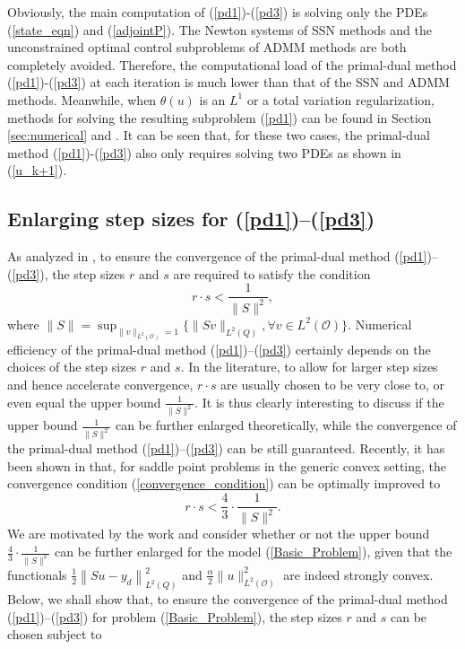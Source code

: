 \documentclass[final]{siamart171218}
\theoremstyle{remark}
\begin{document}
Obviously, the main computation of (\ref{pd1})-(\ref{pd3}) is solving only the PDEs (\ref{state_eqn}) and (\ref{adjointP}). The Newton systems of SSN methods and the unconstrained optimal control subproblems of ADMM methods are both completely avoided. Therefore, the computational load of the primal-dual method (\ref{pd1})-(\ref{pd3}) at each iteration is much lower than that of the SSN and ADMM methods.  Meanwhile, when $\theta(u)$ is an $L^1$ or a total variation regularization, methods for solving the resulting subproblem (\ref{pd1}) can be found in Section \ref{sec:numerical} and \cite{song2023admmpinns}. It can be seen that, for these two cases, the primal-dual method (\ref{pd1})-(\ref{pd3}) also only requires solving two PDEs as shown in (\ref{u_k+1}).

\subsection{Enlarging step sizes for (\ref{pd1})--(\ref{pd3})}
As analyzed in \cite{chambolle2011first}, to ensure the convergence of the primal-dual method (\ref{pd1})--(\ref{pd3}),  the step sizes $r$ and $s$ are required to satisfy the condition
\begin{equation}\label{convergence_condition}
	r\cdot s<\frac{1}{\|S\|^2},
\end{equation}
where
$
\|S\|={\sup}_{\|v\|_{L^2(\mathcal{O})}=1}\{\|Sv\|_{L^2(Q)}, \forall v\in L^2(\mathcal{O})\}
$. Numerical efficiency of the primal-dual method (\ref{pd1})--(\ref{pd3}) certainly depends on the choices of the step sizes $r$ and
$s$. In the literature, to allow for larger step sizes and hence accelerate convergence, $r\cdot s$ are usually chosen to be very close to, or even equal the upper bound $\frac{1}{\|S\|^2}$. It is thus clearly interesting to discuss if the upper bound $\frac{1}{\|S\|^2}$ can be further enlarged theoretically, while the convergence of the primal-dual method (\ref{pd1})--(\ref{pd3}) can be still guaranteed.
Recently, it has been shown in \cite{he2022} that, for saddle point problems in the generic convex setting, the convergence condition (\ref{convergence_condition}) can be optimally improved to
$$
r\cdot s < \frac{4}{3} \cdot \frac{1}{\|S \|^2}.
$$
We are motivated by the work \cite{he2022} and consider whether or not the upper bound $\frac{4}{3} \cdot \frac{1}{\|S \|^2}$ can be further enlarged for the model (\ref{Basic_Problem}), given that the functionals $ \frac{1}{2}\left\| Su-y_d \right\|_{L^2(Q)}^2$ and $\frac{\alpha}{2}\|u\|_{L^2(\mathcal{O})}^2$ are indeed strongly convex. Below, we shall show that, to ensure the convergence of the primal-dual method (\ref{pd1})--(\ref{pd3}) for problem (\ref{Basic_Problem}), the step sizes $r$ and $s$ can be chosen subject to
\end{document}
